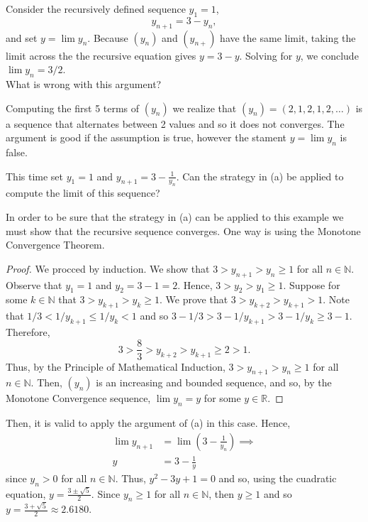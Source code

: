 \documentclass[12pt]{article}
\newcommand{\N}{\mathbb{N}}
\newcommand{\R}{\mathbb{R}}
\newenvironment{problem}[2][Problem]{\begin{trivlist} \item[\hskip \labelsep {\bfseries #1}\hskip \labelsep {\bfseries #2.}]}{\end{trivlist}}
\newenvironment{solution}[1][Solution]{\begin{trivlist} \item[\hskip \labelsep {\bfseries #1}]}{\end{trivlist}}
\begin{document}
\begin{problem}{2.4.2}
\begin{enumerate}
  \item Consider the recursively defined sequence $y_{1} = 1$,
\begin{equation*}
  y_{n+1} = 3-y_{n},
\end{equation*}
and set $y=\lim y_{n}$. Because $(y_{n})$ and $(y_{n+})$ have the same limit, taking the limit across the the recursive equation gives $y=3-y$. Solving for $y$, we conclude $\lim y_{n} = 3/2$.\\
What is wrong with this argument?
\begin{solution}
  Computing the first 5 terms of $(y_{n})$ we realize that $(y_{n}) = \left( 2,1,2,1,2,\dots \right)$ is a sequence that alternates between 2 values and so it does not converges. The argument is good if the assumption is true, however the stament $y=\lim y_{n}$ is false.
\end{solution}
\item This time set $y_{1} = 1$ and $y_{n+1} = 3-\frac{1}{y_{n}}$. Can the strategy in (a) be applied to compute the limit of this sequence?
\begin{solution}
  In order to be sure that the strategy in (a) can be applied to this example we must show that the recursive sequence converges. One way is using the Monotone Convergence Theorem.  
\begin{proof}
  We procced by induction. We show that $3>y_{n+1}>y_{n}\geq 1$ for all $n\in \N$. Observe that $y_{1} = 1$ and $y_{2} = 3-1=2$. Hence, $3>y_{2}>y_{1}\geq1$. Suppose for some $k\in \N$ that $3>y_{k+1}>y_{k}\geq1$. We prove that $3>y_{k+2}>y_{k+1}>1$. Note that $1/3 < 1/y_{k+1} \leq 1/y_{k} < 1$ and so $3-1/3 > 3-1/y_{k+1} > 3-1/y_{k} \geq3-1$. Therefore, 
\begin{equation*}
  3>\frac{8}{3} > y_{k+2} > y_{k+1} \geq 2 > 1.
\end{equation*}
Thus, by the Principle of Mathematical Induction, $3>y_{n+1}>y_{n}\geq 1$ for all $n\in \N$. Then, $(y_{n})$ is an increasing and bounded sequence, and so, by the Monotone Convergence sequence, $\lim y_{n} = y$ for some $y\in \R$.
\end{proof}
Then, it is valid to apply the argument of (a) in this case. Hence,
\begin{align*}
  \lim y_{n+1} &= \lim \left( 3-\frac{1}{y_{n}} \right)\implies\\
  y &= 3-\frac{1}{y}
\end{align*}
since $y_{n} > 0$ for all $n\in \N$. Thus, $y^{2}-3y+1=0$ and so, using the cuadratic equation, $y= \frac{3\pm\sqrt{5}}{2}$. Since $y_{n}\geq1$ for all $n\in \N$, then $y\geq1$ and so $y=\frac{3+\sqrt{5}}{2}\approx 2.6180$.
\end{solution}
\end{enumerate}
\end{problem}
\end{document}
